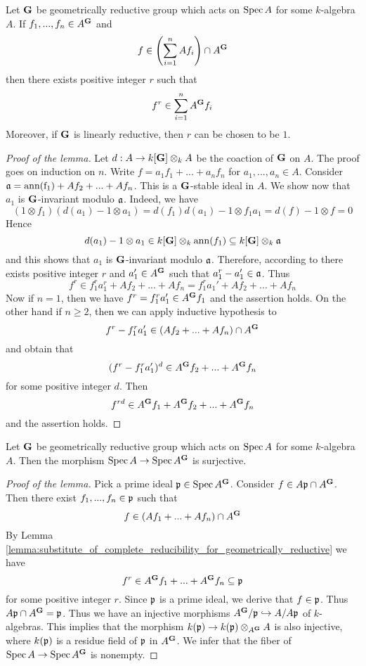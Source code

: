 \begin{lemma}\label{lemma:substitute_of_complete_reducibility_for_geometrically_reductive}
Let $\mathbf{G}$ be geometrically reductive group which acts on $\mathrm{Spec}\, A$ for some $k$-algebra $A$. If $f_1,...,f_n\in A^{\mathbf{G}}$ and 
$$f \in \left(\sum_{i=1}^nAf_i\right)\cap A^{\mathbf{G}}$$
then there exists positive integer $r$ such that 
$$f^r \in \sum_{i=1}^nA^{\mathbf{G}}f_i$$
Moreover, if $\mathbf{G}$ is linearly reductive, then $r$ can be chosen to be $1$.
\end{lemma}
\begin{proof}[Proof of the lemma]
Let $d:A\rightarrow k[\mathbf{G}]\otimes_kA$ be the coaction of $\mathbf{G}$ on $A$. The proof goes on induction on $n$. Write $f = a_1f_1+...+a_nf_n$ for $a_1,...,a_n\in A$. Consider $\mathfrak{a} = \mathrm{ann(f_1)} + Af_2+...+Af_n$. This is a $\mathbf{G}$-stable ideal in $A$. We show now that $a_1$ is $\mathbf{G}$-invariant modulo $\mathfrak{a}$. Indeed, we have
$$\left(1\otimes f_1\right)\left(d(a_1) - 1\otimes a_1\right) = d(f_1)d(a_1) - 1\otimes f_1a_1 = d(f) - 1\otimes f = 0$$
Hence 
$$d(a_1) - 1\otimes a_1 \in k[\mathbf{G}]\otimes_k \mathrm{ann}(f_1) \subseteq k[\mathbf{G}]\otimes_k \mathfrak{a}$$
and this shows that $a_1$ is $\mathbf{G}$-invariant modulo $\mathfrak{a}$. Therefore, according to {\cite[Theorem 2.4]{Geometrically_reductive_and_Nagata}} there exists positive integer $r$ and $a_1'\in A^{\mathbf{G}}$ such that $a_1^{r} - a_1' \in \mathfrak{a}$. Thus
$$f^r \in f_1^ra_1^r + Af_2+...+Af_n = f_1^ra_1' + Af_2+...+Af_n$$
Now if $n=1$, then we have $f^r = f_1^ra_1' \in A^{\mathbf{G}}f_1$ and the assertion holds. On the other hand if $n\geq 2$, then we can apply inductive hypothesis to 
$$f^r - f_1^ra_1'\in \left(Af_2+...+Af_n\right)\cap A^{\mathbf{G}}$$
and obtain that 
$$(f^r - f_1^ra_1')^d \in A^{\mathbf{G}}f_2 +...+ A^{\mathbf{G}}f_n$$
for some positive integer $d$. Then
$$f^{rd} \in A^{\mathbf{G}}f_1+ A^{\mathbf{G}}f_2 +...+ A^{\mathbf{G}}f_n$$
and the assertion holds.
\end{proof}

\begin{lemma}\label{lemma:surjectivity_of_the_affine_quotient}
Let $\mathbf{G}$ be geometrically reductive group which acts on $\mathrm{Spec}\, A$ for some $k$-algebra $A$. Then the morphism $\mathrm{Spec}\, A\rightarrow \mathrm{Spec}\, A^{\mathbf{G}}$ is surjective.
\end{lemma}
\begin{proof}[Proof of the lemma]
Pick a prime ideal $\mathfrak{p}\in \mathrm{Spec}\, A^{\mathbf{G}}$. Consider $f \in A\mathfrak{p}\cap A^{\mathbf{G}}$. Then there exist $f_1,...,f_n\in \mathfrak{p}$ such that
$$f \in \left(Af_1+...+Af_n\right)\cap A^{\mathbf{G}}$$
By Lemma \ref{lemma:substitute_of_complete_reducibility_for_geometrically_reductive} we have
$$f^r \in A^{\mathbf{G}}f_1+ ... + A^{\mathbf{G}}f_n \subseteq \mathfrak{p}$$
for some positive integer $r$. Since $\mathfrak{p}$ is a prime ideal, we derive that $f\in \mathfrak{p}$. Thus $A\mathfrak{p}\cap A^{\mathbf{G}} = \mathfrak{p}$. Thus we have an injective morphisms $A^{\mathbf{G}}/\mathfrak{p} \hookrightarrow A/A\mathfrak{p}$ of $k$-algebras. This implies that the morphism $k(\mathfrak{p}) \rightarrow k(\mathfrak{p})\otimes_{A^{\mathbf{G}}}A$ is also injective, where $k(\mathfrak{p})$ is a residue field of $\mathfrak{p}$ in $A^{\mathbf{G}}$. We infer that the fiber of $\mathrm{Spec}\, A\rightarrow \mathrm{Spec}\, A^{\mathbf{G}}$ is nonempty. 
\end{proof}

